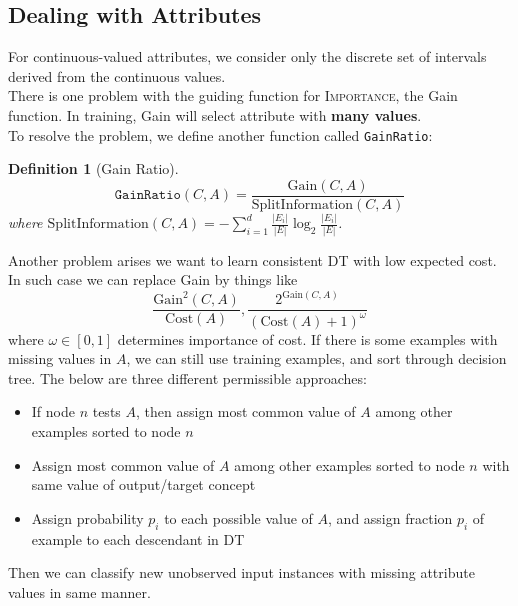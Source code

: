 \documentclass[12pt]{article}
\newtheorem{definition}{Definition}[section]
\theoremstyle{definition}
\begin{document}
\subsection{Dealing with Attributes}
For continuous-valued attributes, we consider only the discrete set of intervals derived from the continuous values.\\
There is one problem with the guiding function for \textsc{Importance}, the Gain function. In training, Gain will select attribute with \textbf{many values}.\\
To resolve the problem, we define another function called \texttt{GainRatio}:
\begin{definition}[Gain Ratio]
\normalfont 
\[
\texttt{GainRatio}(C,A)= \frac{\mathrm{Gain}(C,A)}{\mathrm{SplitInformation}(C,A)}
\]
where $\mathrm{SplitInformation}(C,A)=-\sum_{i=1}^d\frac{|E_i|}{|E|}\log_2\frac{|E_i|}{|E|}$.
\end{definition}
Another problem arises we want to learn consistent DT with low expected cost. In such case we can replace Gain by things like
\[
\frac{\mathrm{Gain}^2(C,A)}{\mathrm{Cost}(A)}, \frac{2^{\mathrm{Gain}(C,A)}}{(\mathrm{Cost}(A)+1)^\omega}
\]
where $\omega\in[0,1]$ determines importance of cost.
If there is some examples with missing values in $A$, we can still use training examples, and sort through decision tree. The below are three different permissible approaches:
\begin{itemize}
	\item If node $n$ tests $A$, then assign most common value of $A$ among other examples sorted to node $n$
	\item Assign most common value of $A$ among other examples sorted to node $n$ with same value of output/target concept
	\item Assign probability $p_i$ to each possible value of $A$, and assign fraction $p_i$ of example to each descendant in DT
\end{itemize}
Then we can classify new unobserved input instances with missing attribute values in same manner.
\end{document}
